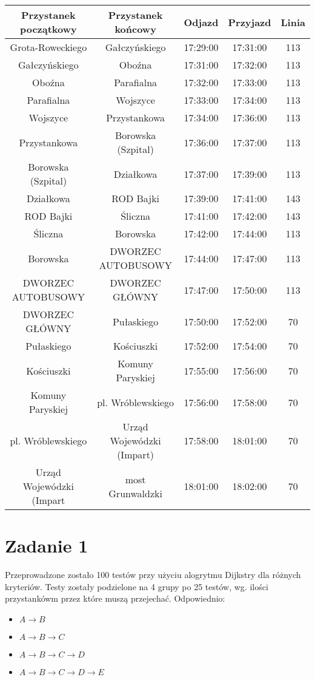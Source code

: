 \documentclass[12pt,a4paper]{article}
\begin{document}
\noindent
\begin{adjustwidth}{-40pt}{100pt}
\begin{tabular}{ |c|c|c|c|c| }
\hline
Przystanek początkowy & Przystanek końcowy &Odjazd&Przyjazd&Linia\\
\hline
Grota-Roweckiego & Gałczyńskiego & 17:29:00 & 17:31:00 & 113\\
Gałczyńskiego & Oboźna & 17:31:00 & 17:32:00 & 113 \\
Oboźna & Parafialna & 17:32:00 & 17:33:00 & 113 \\
Parafialna & Wojszyce & 17:33:00 & 17:34:00 & 113 \\
Wojszyce & Przystankowa & 17:34:00 & 17:36:00 & 113 \\
Przystankowa & Borowska (Szpital) & 17:36:00 & 17:37:00 & 113 \\
Borowska (Szpital) & Działkowa & 17:37:00 & 17:39:00 & 113 \\
Działkowa & ROD Bajki & 17:39:00 & 17:41:00 & 143 \\
ROD Bajki & Śliczna & 17:41:00 & 17:42:00 & 143 \\
Śliczna & Borowska & 17:42:00 & 17:44:00 & 113 \\
Borowska & DWORZEC AUTOBUSOWY & 17:44:00 & 17:47:00 & 113 \\
DWORZEC AUTOBUSOWY & DWORZEC GŁÓWNY & 17:47:00 & 17:50:00 & 113 \\
DWORZEC GŁÓWNY & Pułaskiego & 17:50:00 & 17:52:00 & 70 \\
Pułaskiego & Kościuszki & 17:52:00 & 17:54:00 & 70 \\
Kościuszki & Komuny Paryskiej & 17:55:00 & 17:56:00 & 70 \\
Komuny Paryskiej & pl. Wróblewskiego & 17:56:00 & 17:58:00 & 70 \\
pl. Wróblewskiego & Urząd Wojewódzki (Impart) & 17:58:00 & 18:01:00 & 70 \\
Urząd Wojewódzki (Impart & most Grunwaldzki & 18:01:00 & 18:02:00 & 70 \\
\hline
\end{tabular}
\end{adjustwidth}

    \section*{Zadanie 1}
    Przeprowadzone zostało 100 testów przy użyciu alogrytmu Dijkstry dla różnych kryteriów. Testy zostały podzielone na 4 grupy po 25 testów, wg. ilości przystankówm przez które muszą przejechać. Odpowiednio:
    \begin{itemize}
        \item $A \rightarrow B$
        \item $A \rightarrow B \rightarrow C$
        \item $A \rightarrow B \rightarrow C \rightarrow D$
        \item $A \rightarrow B \rightarrow C \rightarrow D \rightarrow E$
    \end{itemize}
\end{document}
